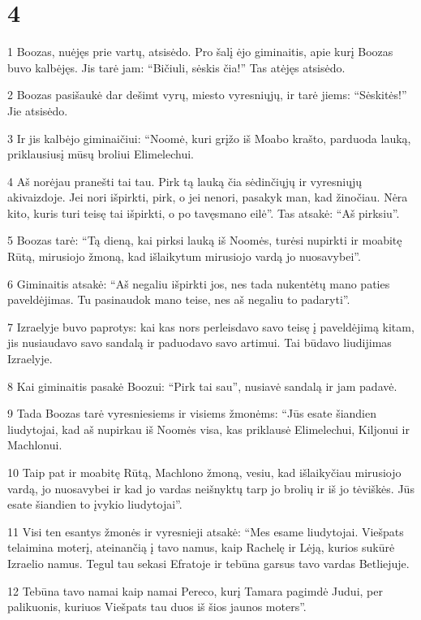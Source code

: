 \chapter{4}

\par 1 Boozas, nuėjęs prie vartų, atsisėdo. Pro šalį ėjo giminaitis, apie kurį Boozas buvo kalbėjęs. Jis tarė jam: “Bičiuli, sėskis čia!” Tas atėjęs atsisėdo. 
\par 2 Boozas pasišaukė dar dešimt vyrų, miesto vyresniųjų, ir tarė jiems: “Sėskitės!” Jie atsisėdo. 
\par 3 Ir jis kalbėjo giminaičiui: “Noomė, kuri grįžo iš Moabo krašto, parduoda lauką, priklausiusį mūsų broliui Elimelechui. 
\par 4 Aš norėjau pranešti tai tau. Pirk tą lauką čia sėdinčiųjų ir vyresniųjų akivaizdoje. Jei nori išpirkti, pirk, o jei nenori, pasakyk man, kad žinočiau. Nėra kito, kuris turi teisę tai išpirkti, o po tavęs­mano eilė”. Tas atsakė: “Aš pirksiu”. 
\par 5 Boozas tarė: “Tą dieną, kai pirksi lauką iš Noomės, turėsi nupirkti ir moabitę Rūtą, mirusiojo žmoną, kad išlaikytum mirusiojo vardą jo nuosavybei”. 
\par 6 Giminaitis atsakė: “Aš negaliu išpirkti jos, nes tada nukentėtų mano paties paveldėjimas. Tu pasinaudok mano teise, nes aš negaliu to padaryti”. 
\par 7 Izraelyje buvo paprotys: kai kas nors perleisdavo savo teisę į paveldėjimą kitam, jis nusiaudavo savo sandalą ir paduodavo savo artimui. Tai būdavo liudijimas Izraelyje. 
\par 8 Kai giminaitis pasakė Boozui: “Pirk tai sau”, nusiavė sandalą ir jam padavė. 
\par 9 Tada Boozas tarė vyresniesiems ir visiems žmonėms: “Jūs esate šiandien liudytojai, kad aš nupirkau iš Noomės visa, kas priklausė Elimelechui, Kiljonui ir Machlonui. 
\par 10 Taip pat ir moabitę Rūtą, Machlono žmoną, vesiu, kad išlaikyčiau mirusiojo vardą, jo nuosavybei ir kad jo vardas neišnyktų tarp jo brolių ir iš jo tėviškės. Jūs esate šiandien to įvykio liudytojai”. 
\par 11 Visi ten esantys žmonės ir vyresnieji atsakė: “Mes esame liudytojai. Viešpats telaimina moterį, ateinančią į tavo namus, kaip Rachelę ir Lėją, kurios sukūrė Izraelio namus. Tegul tau sekasi Efratoje ir tebūna garsus tavo vardas Betliejuje. 
\par 12 Tebūna tavo namai kaip namai Pereco, kurį Tamara pagimdė Judui, per palikuonis, kuriuos Viešpats tau duos iš šios jaunos moters”. 
